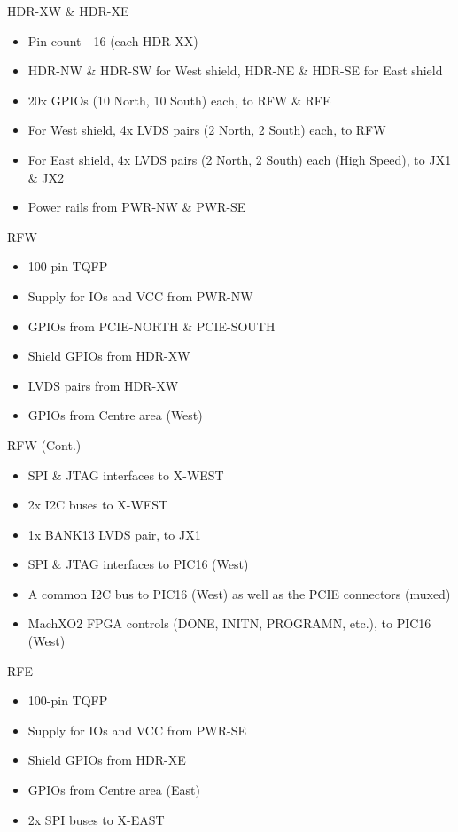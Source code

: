\documentclass{beamer}
\begin{document}
\begin{frame}{HDR-XW \& HDR-XE}
    \begin{itemize}
    \item Pin count - 16 (each HDR-XX)
    \item HDR-NW \& HDR-SW for West shield, HDR-NE \& HDR-SE for East shield
    \item 20x GPIOs (10 North, 10 South) each, to RFW \& RFE 
    \item For West shield, 4x LVDS pairs (2 North, 2 South) each, to RFW 
    \item For East shield, 4x LVDS pairs (2 North, 2 South) each (High Speed), to JX1 \& JX2
    \item Power rails from PWR-NW \& PWR-SE
    \end{itemize}
\end{frame}

\begin{frame}{RFW}
    \begin{itemize}
    \item 100-pin TQFP
    \item Supply for IOs and VCC from PWR-NW
    \item GPIOs from PCIE-NORTH \& PCIE-SOUTH
    \item Shield GPIOs from HDR-XW 
    \item LVDS pairs from HDR-XW
    \item GPIOs from Centre area (West)  
    \end{itemize}
\end{frame}

\begin{frame}{RFW (Cont.)}
    \begin{itemize}
    \item SPI \& JTAG interfaces to X-WEST
    \item 2x I2C buses to X-WEST
    \item 1x BANK13 LVDS pair, to JX1
    \item SPI \& JTAG interfaces to PIC16 (West)
    \item A common I2C bus to PIC16 (West) as well as the PCIE connectors (muxed)
    \item MachXO2 FPGA controls (DONE, INITN, PROGRAMN, etc.), to PIC16 (West) 
    \end{itemize}
\end{frame}

\begin{frame}{RFE}
    \begin{itemize}
    \item 100-pin TQFP
    \item Supply for IOs and VCC from PWR-SE
    \item Shield GPIOs from HDR-XE 
    \item GPIOs from Centre area (East)
    \item 2x SPI buses to X-EAST
    \end{itemize}
\end{frame}
\end{document}
